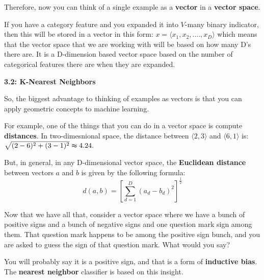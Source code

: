 \documentclass{article}
\begin{document}
\vspace{0.5cm}

Therefore, now you can think of a single example as a \textbf{vector} in a \textbf{vector space}.

\vspace{0.5cm}

If you have a category feature and you expanded it into $V$-many binary indicator, then this will be stored in a vector in this form: $x = \langle x_1, x_2, ...., x_D \rangle $ which means that
the vector space that we are working with will be based on how many D's there are. It is a D-dimension based vector space based on the number of categorical features there are when they are expanded.

\vspace{0.5cm}

\newpage

\LARGE \textbf{3.2: K-Nearest Neighbors}

\vspace{0.7cm}

\large So, the biggest advantage to thinking of examples as vectors is that you can apply geometric concepts to machine learning.

\vspace{0.5cm}

For example, one of the things that you can do in a vector space is compute \textbf{distances}. In two-dimesnional space, the distance between $\langle 2,3 \rangle$ and $\langle 6,1 \rangle $ is: $\sqrt{(2 - 6)^2 + (3 - 1) ^ 2} \thickapprox 4.24. $

\vspace{0.5cm}

But, in general, in any D-dimensional vector space,  the \textbf{Euclidean distance} between vectors $a$ and $b$ is given by the following formula:
$$d(a,b) = [\sum_{d = 1}^{D} (a_d - b_d)^2 ]^\frac{1}{2} $$

\vspace{0.5cm}

Now that we have all that, consider a vector space where we have a bunch of positive signs and a bunch of negative signs and one question mark sign among them.
That question mark happens to be among the positive sign bunch, and you are asked to guess the sign of that question mark. What would you say?

\vspace{0.5cm}

You will probably say it is a positive sign, and that is a form of \textbf{inductive bias}. The \textbf{nearest neighbor} classifier is based on this insight.
\end{document}
